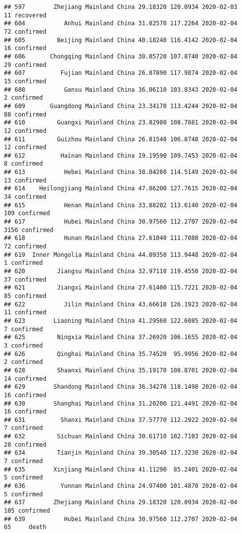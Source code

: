 \documentclass[
]{article}
\begin{document}
\begin{verbatim}
## 597        Zhejiang Mainland China 29.18320 120.0934 2020-02-03    11 recovered
## 604           Anhui Mainland China 31.82570 117.2264 2020-02-04    72 confirmed
## 605         Beijing Mainland China 40.18240 116.4142 2020-02-04    16 confirmed
## 606       Chongqing Mainland China 30.05720 107.8740 2020-02-04    29 confirmed
## 607          Fujian Mainland China 26.07890 117.9874 2020-02-04    15 confirmed
## 608           Gansu Mainland China 36.06110 103.8343 2020-02-04     2 confirmed
## 609       Guangdong Mainland China 23.34170 113.4244 2020-02-04    88 confirmed
## 610         Guangxi Mainland China 23.82980 108.7881 2020-02-04    12 confirmed
## 611         Guizhou Mainland China 26.81540 106.8748 2020-02-04    12 confirmed
## 612          Hainan Mainland China 19.19590 109.7453 2020-02-04     8 confirmed
## 613           Hebei Mainland China 38.04280 114.5149 2020-02-04    13 confirmed
## 614    Heilongjiang Mainland China 47.86200 127.7615 2020-02-04    34 confirmed
## 615           Henan Mainland China 33.88202 113.6140 2020-02-04   109 confirmed
## 617           Hubei Mainland China 30.97560 112.2707 2020-02-04  3156 confirmed
## 618           Hunan Mainland China 27.61040 111.7088 2020-02-04    72 confirmed
## 619  Inner Mongolia Mainland China 44.09350 113.9448 2020-02-04     1 confirmed
## 620         Jiangsu Mainland China 32.97110 119.4550 2020-02-04    37 confirmed
## 621         Jiangxi Mainland China 27.61400 115.7221 2020-02-04    85 confirmed
## 622           Jilin Mainland China 43.66610 126.1923 2020-02-04    11 confirmed
## 623        Liaoning Mainland China 41.29560 122.6085 2020-02-04     7 confirmed
## 625         Ningxia Mainland China 37.26920 106.1655 2020-02-04     3 confirmed
## 626         Qinghai Mainland China 35.74520  95.9956 2020-02-04     2 confirmed
## 628         Shaanxi Mainland China 35.19170 108.8701 2020-02-04    14 confirmed
## 629        Shandong Mainland China 36.34270 118.1498 2020-02-04    16 confirmed
## 630        Shanghai Mainland China 31.20200 121.4491 2020-02-04    16 confirmed
## 631          Shanxi Mainland China 37.57770 112.2922 2020-02-04     7 confirmed
## 632         Sichuan Mainland China 30.61710 102.7103 2020-02-04    28 confirmed
## 634         Tianjin Mainland China 39.30540 117.3230 2020-02-04     7 confirmed
## 635        Xinjiang Mainland China 41.11290  85.2401 2020-02-04     5 confirmed
## 636          Yunnan Mainland China 24.97400 101.4870 2020-02-04     5 confirmed
## 637        Zhejiang Mainland China 29.18320 120.0934 2020-02-04   105 confirmed
## 639           Hubei Mainland China 30.97560 112.2707 2020-02-04    65     death

\end{verbatim}
\end{document}

